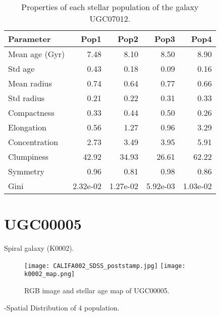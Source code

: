 \begin{table}[h]
\centering
\begin{tabular}{l|r|r|r|r}
Parameter & Pop1 & Pop2 & Pop3 & Pop4 \\\hline
Mean age (Gyr) & 7.48 & 8.10 & 8.50 & 8.90 \\
Std age & 0.43 & 0.18 & 0.09 & 0.16 \\
Mean radius & 0.74 & 0.64 & 0.77 & 0.66 \\
Std radius & 0.21 & 0.22 & 0.31 & 0.33 \\
Compactness & 0.33 & 0.44 & 0.50 & 0.26 \\
Elongation & 0.56 & 1.27 & 0.96 & 3.29 \\
Concentration & 2.73  & 3.49 & 3.95 & 5.91 \\
Clumpiness & 42.92  & 34.93 & 26.61 & 62.22 \\
Symmetry & 0.96 & 0.81 & 0.98 & 0.86 \\
Gini & 2.32e-02 & 1.27e-02 & 5.92e-03 & 1.03e-02 \\

\end{tabular}
\caption{\label{tab:widgets}Properties of each stellar population of the galaxy UGC07012.}
\end{table}


\newpage
\section*{UGC00005}
Spiral galaxy (K0002).

\begin{figure}[bh]
\begin{center}
\texttt{[image: CALIFA002\_SDSS\_poststamp.jpg]}
\texttt{[image: k0002\_map.png]}
\caption{RGB image and stellar age map of UGC00005.}
   \label{fig1}
\end{center}
\end{figure}

-Spatial Distribution of 4 population.

